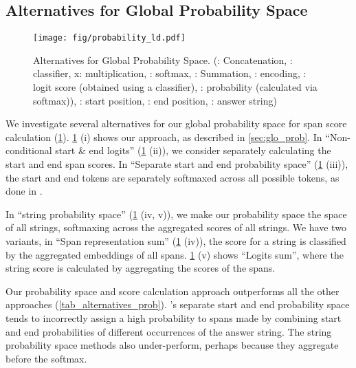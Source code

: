 \documentclass[11pt]{article}
\begin{document}
\subsection{Alternatives for Global Probability Space}
\begin{figure}[hbt]
\texttt{[image: fig/probability\_ld.pdf]} 
\caption{Alternatives for Global Probability Space. (: Concatenation, : classifier, x: multiplication, : softmax,  : Summation, : encoding, : logit score (obtained using a classifier), : probability (calculated via softmax)), : start position, : end position, : answer string)}
\label{global_prob}
\end{figure}

We investigate several alternatives for our global probability space for span score calculation (\cref{global_prob}). \cref{global_prob} (i) shows our approach, as described in \cref{sec:glo_prob}. In ``Non-conditional start \& end logits'' (\cref{global_prob} (ii)), we consider separately calculating the start and end span scores. In ``Separate start and end probability space'' (\cref{global_prob} (iii)), the start and end tokens are separately softmaxed across all possible tokens, as done in \citet{prob-assum}.

In ``string probability space'' (\cref{global_prob} (iv, v)), we make our probability space the space of all strings, softmaxing across the aggregated scores of all strings. We have two variants, in ``Span representation sum'' (\cref{global_prob} (iv)), the score for a string is classified by the aggregated embeddings of all spans. \cref{global_prob} (v) shows ``Logits sum'', where the string score is calculated by aggregating the scores of the spans.

Our probability space and score calculation approach outperforms all the other approaches (\cref{tab_alternatives_prob}). \citet{prob-assum}'s separate start and end probability space tends to incorrectly assign a high probability to spans made by combining start and end probabilities of different occurrences of the answer string. The string probability space methods also under-perform, perhaps because they aggregate before the softmax.
 
\end{document}
